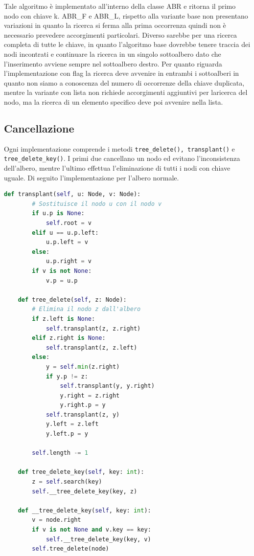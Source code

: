 \documentclass{article}
\begin{document}
Tale algoritmo è implementato all'interno della classe ABR e ritorna il primo nodo con chiave k.
ABR\_F e ABR\_L, rispetto alla variante base non presentano variazioni in quanto la ricerca si ferma alla prima occorrenza quindi non è necessario prevedere accorgimenti particolari. Diverso sarebbe per una ricerca completa di tutte le chiave, in quanto l'algoritmo base dovrebbe tenere traccia dei nodi incontrati e continuare la ricerca in un singolo sottoalbero dato che l'inserimento avviene sempre nel sottoalbero destro. Per quanto riguarda l'implementazione con flag la ricerca deve avvenire in entrambi i sottoalberi in quanto non siamo a conoscenza del numero di occorrenze della chiave duplicata, mentre la variante con lista non richiede accorgimenti aggiuntivi per laricerca del nodo, ma la ricerca di un elemento specifico deve poi avvenire nella lista.

\subsection{Cancellazione}
Ogni implementazione comprende i metodi \verb|tree_delete(), transplant()| e \verb|tree_delete_key()|.
I primi due cancellano un nodo ed evitano l'inconsistenza dell'albero, mentre l'ultimo effettua l'eliminazione di tutti i nodi con chiave uguale. Di seguito l'implementazione per l'albero normale.

\begin{lstlisting}[language=Python, caption={Algoritmo di eliminazione base}, label=inserimentobase]
       def transplant(self, u: Node, v: Node):
        # Sostituisce il nodo u con il nodo v
        if u.p is None:
            self.root = v
        elif u == u.p.left:
            u.p.left = v
        else:
            u.p.right = v
        if v is not None:
            v.p = u.p

    def tree_delete(self, z: Node):
        # Elimina il nodo z dall'albero
        if z.left is None:
            self.transplant(z, z.right)
        elif z.right is None:
            self.transplant(z, z.left)
        else:
            y = self.min(z.right)
            if y.p != z:
                self.transplant(y, y.right)
                y.right = z.right
                y.right.p = y
            self.transplant(z, y)
            y.left = z.left
            y.left.p = y

        self.length -= 1
        
    def tree_delete_key(self, key: int):
        z = self.search(key)
        self.__tree_delete_key(key, z)

    def __tree_delete_key(self, key: int):
        v = node.right
        if v is not None and v.key == key:
            self.__tree_delete_key(key, v)
        self.tree_delete(node)   
\end{lstlisting}
\end{document}
